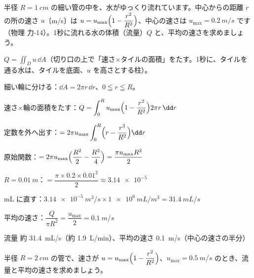\begin{reidai}[管を流れる水の量]
半径 $R=\qty{1}{cm}$ の細い管の中を、水がゆっくり流れています。中心からの距離 $r$ の所の速さ $u$〔m/s〕は $u=u_{\max}\Bigl(1-\dfrac{r^2}{R^2}\Bigr)$、中心の速さは $u_{\max}=\qty{0.2}{m/s}$ です（物理 力-14）。1秒に流れる水の体積（流量）$Q$ と、平均の速さを求めましょう。\par
\kangaekata {}\par
{}\enspace $Q=\iint_D u\,\dd A$（切り口の上で「速さ×タイルの面積」をたす。1秒に、タイルを通る水は、タイルを底面、$u$ を高さとする柱）。\par
{}\enspace 細い輪に分ける：$\dd A=2\pi r\,\dd r$、$0\leqq r\leqq R$。\par
\shiki\kviiigs{}\zw{} 速さ×輪の面積をたす：$\displaystyle Q=\int_0^R u_{\max}\Bigl(1-\dfrac{r^2}{R^2}\Bigr)2\pi r\,\dd r$\par
\kviiiga 定数を外へ出す：$\displaystyle =2\pi u_{\max}\int_0^R\Bigl(r-\dfrac{r^3}{R^2}\Bigr)\dd r$\par
\kviiiga 原始関数：$\displaystyle =2\pi u_{\max}\Bigl(\dfrac{R^2}{2}-\dfrac{R^2}{4}\Bigr)=\dfrac{\pi u_{\max}R^2}{2}$\par
\kviiiga $R=\qty{0.01}{m}$：$\displaystyle =\dfrac{\pi\times0.2\times0.01^2}{2}\approx\num{3.14e-5}$\par
\kviiiga mL に直す：$\displaystyle \qty{3.14e-5}{m^3/s}\times\qty{1e6}{mL/m^3}=\qty{31.4}{mL/s}$\par
\kviiiga 平均の速さ：$\displaystyle \dfrac{Q}{\pi R^2}=\dfrac{u_{\max}}{2}=\qty{0.1}{m/s}$\par
\kotae 流量 約 \qty{31.4}{mL/s}（約 \qty{1.9}{L/min}）、平均の速さ \qty{0.1}{m/s}（中心の速さの半分）
\end{reidai}

\begin{jibun}
半径 $R=\qty{2}{cm}$ の管で、速さが $u=u_{\max}\Bigl(1-\dfrac{r^2}{R^2}\Bigr)$、$u_{\max}=\qty{0.5}{m/s}$ のとき、流量と平均の速さを求めましょう。
\end{jibun}

